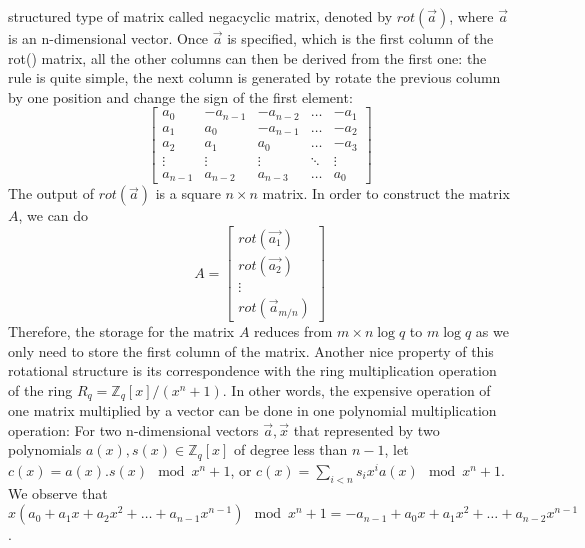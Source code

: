 \begin{description}
\begin{description}
                    structured type of matrix called negacyclic matrix, denoted
                    by $rot(\vec{a})$, where $\vec{a}$ is an n-dimensional
                    vector. Once $\vec{a}$ is specified, which is the first
                    column of the rot() matrix, all the other columns can then
                    be derived from the first one: the rule is quite simple, the
                    next column is generated by rotate the previous column by one
                    position and change the sign of the first element:
                    \[
                        \begin{bmatrix}
                            a_{0}& -a_{n-1}& -a_{n-2}& \dots& -a_1\\
                            a_1& a_0& -a_{n-1}& \dots& -a_2\\
                            a_2& a_1& a_0& \dots& -a_3\\
                            \vdots& \vdots& \vdots& \ddots& \vdots\\
                            a_{n-1}& a_{n-2}& a_{n-3}& \dots& a_0
                        \end{bmatrix}
                    \]
                    The output of $rot(\vec{a})$ is a square $n \times n$
                    matrix. In order to construct the matrix $A$, we can do
                    \[
                        A = \begin{bmatrix}
                            rot(\vec{a_1})\\
                            rot(\vec{a_2})\\
                            \vdots\\
                            rot(\vec{a}_{m/n})
                        \end{bmatrix}
                    \]
                    Therefore, the storage for the matrix $A$ reduces from $m \times n
                    \log q$ to $m \log q$ as we only need to store the first
                    column of the matrix.
                    Another nice property of this rotational structure is its
                    correspondence with the ring multiplication operation of the
                    ring $R_q = \mathbb{Z}_q[x]/(x^n+1)$. In other words,
                    the expensive
                    operation of one matrix multiplied by a vector can be done
                    in one polynomial multiplication operation: For two
                    n-dimensional vectors
                    $\vec{a}, \vec{x}$
                    that represented by two
                    polynomials $a(x), s(x) \in \mathbb{Z}_q[x]$ of degree less
                    than $n -1$, let $c(x) = a(x).s(x) \mod x^n + 1$, or
                    $c(x) = \sum_{i<n}s_ix^ia(x) \mod x^n + 1$. We observe that
                    $x(a_0 + a_1x + a_2x^2 + \dots + a_{n-1}x^{n-1}) \mod x^n + 1
                    =-a_{n-1} + a_0x + a_1x^2 + \dots + a_{n-2}x^{n-1}$.


\end{description}
\end{description}
